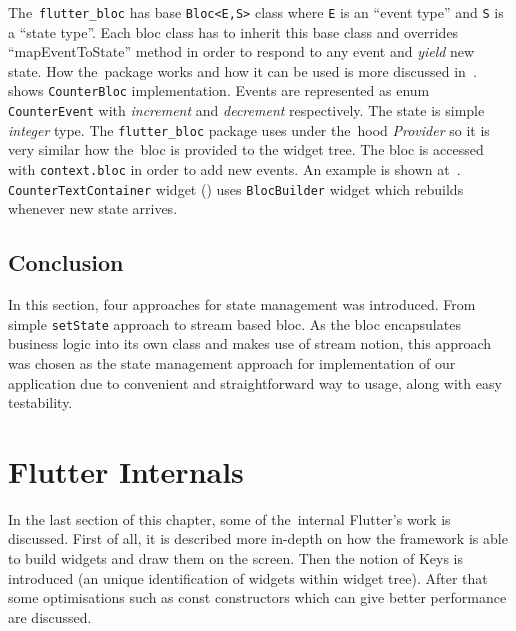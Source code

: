 The~\verb|flutter_bloc| has base \verb|Bloc<E,S>| class where \verb|E| is an ``event type'' and \verb|S| is a ``state type''. Each \gls{bloc} class has to inherit this base class and overrides ``mapEventToState'' method in order to respond to any event and \textit{yield} new state. How the~package works and how it can be used is more discussed in~.  shows \verb|CounterBloc| implementation. Events are represented as enum \verb|CounterEvent| with \textit{increment} and \textit{decrement} respectively. The state is simple \textit{integer} type. The \verb|flutter_bloc| package uses under the~hood \textit{Provider} so it is very similar how the~\gls{bloc} is provided to the widget tree. The bloc is accessed with \verb|context.bloc| in order to add new events. An example is shown at~.  \verb|CounterTextContainer| widget () uses \verb|BlocBuilder| widget which rebuilds whenever new state arrives. 
\subsection{Conclusion}
In this section, four approaches for state management was introduced. From simple \verb|setState| approach to stream based \gls{bloc}. As the \gls{bloc} encapsulates business logic into its own class and makes use of stream notion, this approach was chosen as the state management approach for implementation of our application due to convenient and straightforward way to usage, along with easy testability.
\section{Flutter Internals}
In the last section of this chapter, some of the~internal Flutter's work is discussed. First of all, it is described more in-depth on how the framework is able to build widgets and draw them on the screen. Then the notion of Keys is introduced (an unique identification of widgets within widget tree). After that some optimisations such as const constructors which can give better performance are discussed. 

